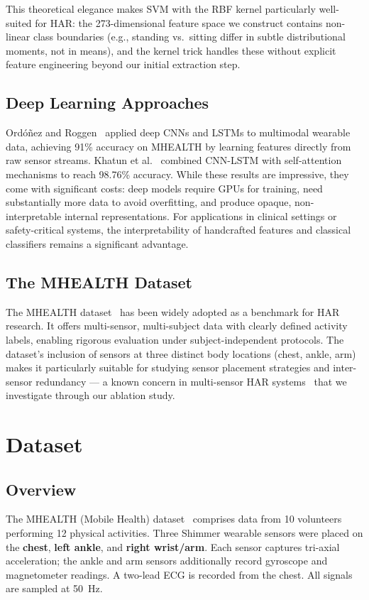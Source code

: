 \documentclass[10pt,twocolumn,letterpaper]{article}
\begin{document}
This theoretical elegance makes SVM with the RBF kernel particularly well-suited for HAR: the 273-dimensional feature space we construct contains non-linear class boundaries (e.g., standing vs.\ sitting differ in subtle distributional moments, not in means), and the kernel trick handles these without explicit feature engineering beyond our initial extraction step.

\subsection{Deep Learning Approaches}
Ord{\'o}{\~n}ez and Roggen~\cite{ordonez2016deep} applied deep CNNs and LSTMs to multimodal wearable data, achieving 91\% accuracy on MHEALTH by learning features directly from raw sensor streams. Khatun et al.~\cite{khatun2022deep} combined CNN-LSTM with self-attention mechanisms to reach 98.76\% accuracy. While these results are impressive, they come with significant costs: deep models require GPUs for training, need substantially more data to avoid overfitting, and produce opaque, non-interpretable internal representations. For applications in clinical settings or safety-critical systems, the interpretability of handcrafted features and classical classifiers remains a significant advantage.

\subsection{The MHEALTH Dataset}
The MHEALTH dataset~\cite{banos2014mhealthdroid} has been widely adopted as a benchmark for HAR research. It offers multi-sensor, multi-subject data with clearly defined activity labels, enabling rigorous evaluation under subject-independent protocols. The dataset's inclusion of sensors at three distinct body locations (chest, ankle, arm) makes it particularly suitable for studying sensor placement strategies and inter-sensor redundancy --- a known concern in multi-sensor HAR systems~\cite{bulling2014tutorial} that we investigate through our ablation study.

\section{Dataset}

\subsection{Overview}
The MHEALTH (Mobile Health) dataset~\cite{banos2014mhealthdroid} comprises data from 10 volunteers performing 12 physical activities. Three Shimmer wearable sensors were placed on the \textbf{chest}, \textbf{left ankle}, and \textbf{right wrist/arm}. Each sensor captures tri-axial acceleration; the ankle and arm sensors additionally record gyroscope and magnetometer readings. A two-lead ECG is recorded from the chest. All signals are sampled at 50~Hz.
\end{document}
